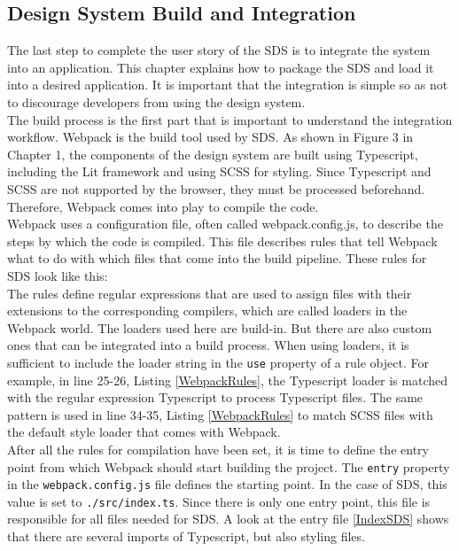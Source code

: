 \subsection{Design System Build and Integration}
The last step to complete the user story of the \ac{SDS} is to integrate the system into an application. This chapter explains how to package the \ac{SDS} and load it into a desired application. It is important that the integration is simple so as not to discourage developers from using the design system. \\

The build process is the first part that is important to understand the integration workflow. Webpack is the build tool used by \ac{SDS}. As shown in Figure 3 in Chapter 1, the components of the design system are built using Typescript, including the Lit framework and using SCSS for styling. Since Typescript and SCSS are not supported by the browser, they must be processed beforehand. Therefore, Webpack comes into play to compile the code. \\
Webpack uses a configuration file, often called webpack.config.js, to describe the steps by which the code is compiled. This file describes rules that tell Webpack what to do with which files that come into the build pipeline. These rules for \ac{SDS} look like this:\\

The rules define regular expressions that are used to assign files with their extensions to the corresponding compilers, which are called loaders in the Webpack world. The loaders used here are build-in. But there are also custom ones that can be integrated into a build process. When using loaders, it is sufficient to include the loader string in the \texttt{use} property of a rule object. For example, in line 25-26, Listing \ref{WebpackRules}, the Typescript loader is matched with the regular expression Typescript to process Typescript files. The same pattern is used in line 34-35, Listing \ref{WebpackRules} to match SCSS files with the default style loader that comes with Webpack.\\
After all the rules for compilation have been set, it is time to define the entry point from which Webpack should start building the project. The \texttt{entry} property in the \texttt{webpack.config.js} file defines the starting point. In the case of \ac{SDS}, this value is set to \texttt{./src/index.ts}. Since there is only one entry point, this file is responsible for all files needed for \ac{SDS}. A look at the entry file \ref{IndexSDS} shows that there are several imports of Typescript, but also styling files.
